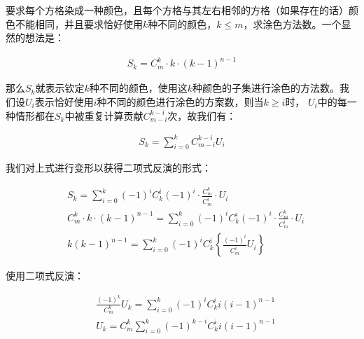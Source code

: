 \documentclass[UTF8]{book}
\begin{document}
要求每个方格染成一种颜色，且每个方格与其左右相邻的方格（如果存在的话）颜色不能相同，并且要求恰好使用$k$种不同的颜色，$k \le m$，求涂色方法数。一个显然的想法是：
\begin{large}
    \begin{equation}
        \begin{aligned}
            S_k = C_m^k \cdot k \cdot (k-1)^{n-1}
            \nonumber
        \end{aligned}
    \end{equation}
\end{large}
那么$S_k$就表示钦定$k$种不同的颜色，使用这$k$种颜色的子集进行涂色的方法数。我们设$U_i$表示恰好使用$i$种不同的颜色进行涂色的方案数，则当$k \ge i$时，
$U_i$中的每一种情形都在$S_k$中被重复计算贡献$C_{m-i}^{k-i}$次，故我们有：
\begin{large}
    \begin{equation}
        \begin{aligned}
            S_k = \sum_{i=0}^{k} C_{m-i}^{k-i} U_i
            \nonumber
        \end{aligned}
    \end{equation}
\end{large}
我们对上式进行变形以获得二项式反演的形式：
\begin{large}
    \begin{equation}
        \begin{aligned}
            &S_k = \sum_{i=0}^k (-1)^{i} C_k^i (-1)^{i} \cdot \frac{C_m^k}{C_m^i} \cdot U_i \\
            &C_m^k \cdot k \cdot (k-1)^{n-1} = \sum_{i=0}^k (-1)^{i} C_k^i (-1)^{i} \cdot \frac{C_m^k}{C_m^i} \cdot U_i \\
            &k(k-1)^{n-1}=\sum_{i=0}^k (-1)^{i} C_k^i \left \{ \frac{(-1)^{i}}{C_m^i}U_i \right \}
            \nonumber
        \end{aligned}
    \end{equation}
\end{large}
使用二项式反演：
\begin{large}
    \begin{equation}
        \begin{aligned}
            &\frac{(-1)^{k}}{C_m^k} U_k = \sum_{i=0}^k (-1)^{i} C_k^i i(i-1)^{n-1} \\
            &U_k = C_m^k \sum_{i=0}^k (-1)^{k-i} C_k^i i(i-1)^{n-1}
            \nonumber
        \end{aligned}
    \end{equation}
\end{large}
\end{document}
